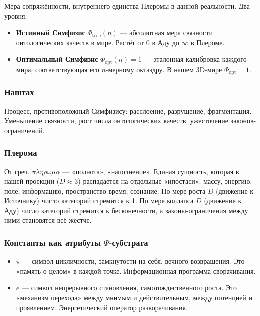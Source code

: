 \documentclass[a4paper,12pt]{article}
\begin{document}
Мера сопряжённости, внутреннего единства Плеромы в данной реальности. Два уровня:
\begin{itemize}
	\item \textbf{Истинный Симфизис} $\Phi_{\text{true}}(n)$ — абсолютная мера связности онтологических качеств в мире. Растёт от 0 в Аду до $\infty$ в Плероме.
	\item \textbf{Оптимальный Симфизис} $\Phi_{\text{opt}}(n) = 1$ — эталонная калибровка каждого мира, соответствующая его $n$-мерному октаэдру. В нашем 3D-мире $\Phi_{\text{opt}} = 1$.
\end{itemize}

\subsubsection{Наштах}

Процесс, противоположный Симфизису: расслоение, разрушение, фрагментация. Уменьшение связности, рост числа онтологических качеств, ужесточение законов-ограничений.

\subsubsection{Плерома}

От греч. $\pi\lambda\eta\rho\omega\mu\alpha$ — «полнота», «наполнение». Единая сущность, которая в нашей проекции ($D \approx 3$) распадается на отдельные «ипостаси»: массу, энергию, поле, информацию, пространство-время, сознание. По мере роста $D$ (движение к Источнику) число категорий стремится к 1. По мере коллапса $D$ (движение к Аду) число категорий стремится к бесконечности, а законы-ограничения между ними становятся всё жёстче.

\subsubsection{Константы как атрибуты $\Psi$-субстрата}

\begin{itemize}
	\item $\pi$ — символ цикличности, замкнутости на себя, вечного возвращения. Это «память о целом» в каждой точке. Информационная программа сворачивания.
	\item $e$ — символ непрерывного становления, самотождественного роста. Это «механизм перехода» между мнимым и действительным, между потенцией и проявлением. Энергетический оператор разворачивания.
\end{itemize}
\end{document}
